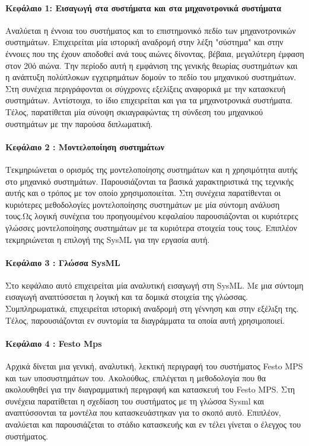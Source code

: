 \documentclass[a4paper, 12pt, twoside]{report}
\begin{document}
		\paragraph{Κεφάλαιο 1: Εισαγωγή στα συστήματα και στα μηχανοτρονικά συστήματα} {Αναλύεται η έννοια του συστήματος και το επιστημονικό πεδίο των μηχανοτρονικών συστημάτων. Επιχειρείται μία ιστορική αναδρομή στην λέξη "σύστημα" και στην έννοιες που της έχουν αποδοθεί ανά τους αιώνες δίνοντας, βέβαια, μεγαλύτερη έμφαση στον 20ό αιώνα. Την περίοδο αυτή η εμφάνιση της γενικής θεωρίας συστημάτων και η ανάπτυξη πολύπλοκων εγχειρημάτων δομούν το πεδίο του μηχανικού συστημάτων. Στη συνέχεια περιγράφονται οι σύγχρονες εξελίξεις αναφορικά με την κατασκευή συστημάτων. Αντίστοιχα, το ίδιο επιχειρείται και για τα μηχανοτρονικά συστήματα. Τέλος, παρατίθεται μία σύνοψη σκιαγραφώντας τη σύνδεση του μηχανικού συστημάτων με την παρούσα διπλωματική.
		}
		\paragraph{Κεφάλαιο 2 : Μοντελοποίηση συστημάτων} {Τεκμηριώνεται ο ορισμός της μοντελοποίησης συστημάτων και η χρησιμότητα αυτής στο μηχανικό συστημάτων. Παρουσιάζονται τα βασικά χαρακτηριστικά της τεχνικής αυτής και ο τρόπος με τον οποίο χρησιμοποιείται. Στη συνέχεια παρατίθενται οι κυριότερες μεθοδολογίες μοντελοποίησης συστημάτων με μία σύντομη ανάλυση τους.Ως λογική συνέχεια του προηγουμένου κεφαλαίου παρουσιάζονται οι κυριότερες γλώσσες  μοντελοποίησης συστημάτων με τα κυριότερα στοιχεία τους τους. Επιπλέον τεκμηριώνεται η επιλογή της SysML για την εργασία αυτή.
		}
		\paragraph{Κεφάλαιο 3 : Γλώσσα SysML} {Στο κεφάλαιο αυτό επιχειρείται μία αναλυτική εισαγωγή στη SysML. Με μια σύντομη εισαγωγή αναπτύσσεται η λογική και τα δομικά στοιχεία της γλώσσας. Συμπληρωματικά, επιχειρείται ιστορική αναδρομή στη γέννηση και στην εξέλιξη της. Τέλος, παρουσιάζονται εν συντομία τα διαγράμματα τα οποία αυτή χρησιμοποιεί.
		}
		\paragraph{Κεφάλαιο 4 : Festo Mps} {Αρχικά δίνεται μια γενική, αναλυτική, λεκτική περιγραφή του συστήματος Festo MPS και των υποσυστημάτων του. Ακολούθως, επιλέγεται η μεθοδολογία που θα ακολουθηθεί για την διαγραμματική περιγραφή και κατασκευή του Festo MPS. Στη συνέχεια παρατίθεται η σχεδίαση του συστήματος με τη γλώσσα Sysml και αναπτύσσονται τα μοντέλα που κατασκευάστηκαν για το σκοπό αυτό. Επιπλέον, αναλύεται και παρουσιάζεται το στάδιο κατασκευής και εν τέλει γίνεται ο έλεγχος του συστήματος.
		}
\end{document}
